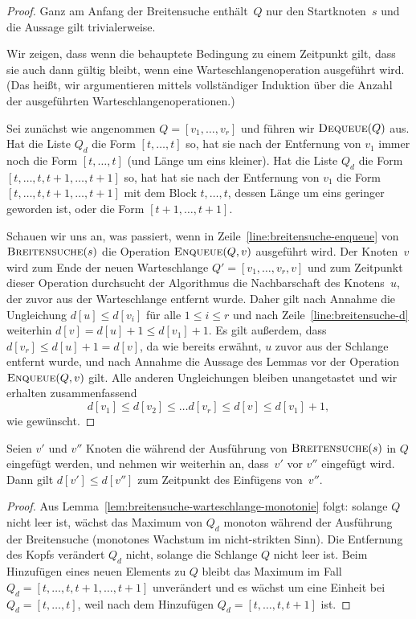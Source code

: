 \begin{proof}
Ganz am Anfang der Breitensuche enthält~$Q$ nur den Startknoten~$s$ und die Aussage gilt trivialerweise.

Wir zeigen, dass wenn die behauptete Bedingung zu einem Zeitpunkt gilt, dass sie auch dann gültig bleibt, wenn eine Warteschlangenoperation ausgeführt wird.
(Das heißt, wir argumentieren mittels vollständiger Induktion über die Anzahl der ausgeführten Warteschlangenoperationen.)

\condclearpage 

Sei zunächst wie angenommen $Q=[v_1,\ldots,v_r]$ und führen wir $\mathop{\text{\textsc{Dequeue}}}(Q)$ aus.
Hat die Liste $Q_d$ die Form $[t,\ldots,t]$ so, hat sie nach der Entfernung von $v_1$ immer noch die Form $[t,\ldots,t]$ (und Länge um eins kleiner).  Hat die Liste $Q_d$ die Form $[t,\ldots,t,t+1,\ldots,t+1]$ so, hat hat sie nach der Entfernung von $v_1$ die Form $[t,\ldots,t,t+1,\ldots,t+1]$ mit dem Block $t,\ldots,t$, dessen Länge um eins geringer geworden ist, oder die Form $[t+1,\ldots,t+1]$. 

\condclearpage 

Schauen wir uns an, was passiert, wenn in Zeile~\ref{line:breitensuche-enqueue} von $\mathop{\text{\textsc{Breitensuche}}}(s)$ die Operation $\mathop{\text{\textsc{Enqueue}}}(Q,v)$ ausgeführt wird.
Der Knoten~$v$ wird zum Ende der neuen Warteschlange $Q'=[v_1,\ldots,v_r,v]$ und zum Zeitpunkt dieser Operation durchsucht der Algorithmus die Nachbarschaft des Knotens~$u$, der zuvor aus der Warteschlange entfernt wurde.
Daher gilt nach Annahme die Ungleichung $d[u] \leq d[v_i]$ für alle $1 \leq i \leq r$ und nach Zeile~\ref{line:breitensuche-d} weiterhin $d[v] = d[u]+1 \leq d[v_1]+1$.
Es gilt außerdem, dass $d[v_r] \leq d[u]+1=d[v]$, da wie bereits erwähnt, $u$ zuvor aus der Schlange entfernt wurde, und nach Annahme die Aussage des Lemmas vor der Operation $\mathop{\text{\textsc{Enqueue}}}(Q,v)$ gilt.
Alle anderen Ungleichungen bleiben unangetastet und wir erhalten zusammenfassend
\[
d[v_1] \leq d[v_2] \leq \ldots d[v_r] \leq d[v] \leq d[v_1] + 1,
\]
wie gewünscht.
\end{proof}

\begin{kor}
\label{cor:breitensuche-warteschlange}
Seien $v'$ und $v''$ Knoten die während der Ausführung von $\mathop{\text{\textsc{Breitensuche}}}(s)$ in $Q$ eingefügt werden, und nehmen wir weiterhin an, dass~$v'$ vor $v''$ eingefügt wird.
Dann gilt $d[v'] \leq d[v'']$ zum Zeitpunkt des Einfügens von~$v''$.
\end{kor}

\begin{proof}
Aus Lemma~\ref{lem:breitensuche-warteschlange-monotonie} folgt: solange $Q$ nicht leer ist, wächst das Maximum von $Q_d$ monoton während der Ausführung der Breitensuche (monotones Wachstum im nicht-strikten Sinn). Die Entfernung des Kopfs verändert $Q_d$ nicht, solange die Schlange $Q$ nicht leer ist. Beim Hinzufügen eines neuen Elements zu $Q$ bleibt das Maximum im Fall $Q_d=[t,\ldots,t,t+1,\ldots,t+1]$ unverändert und es wächst um eine Einheit bei $Q_d=[t,\ldots,t]$, weil nach dem Hinzufügen $Q_d = [t,\ldots,t,t+1]$ ist. 
\end{proof}




